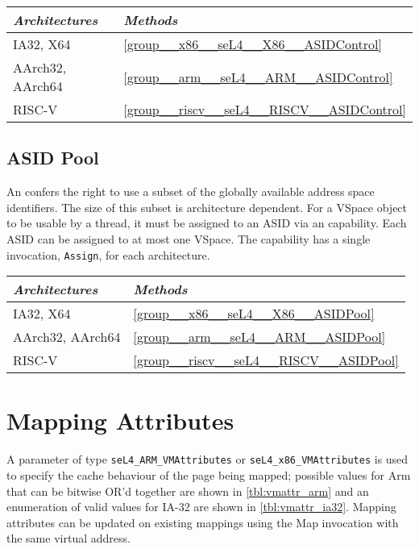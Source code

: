 \begin{tabularx}{\textwidth}{Xl} \toprule
\emph{Architectures} & \emph{Methods} \\ \midrule
IA32, X64            & \autoref{group__x86__seL4__X86__ASIDControl} \\
AArch32, AArch64     & \autoref{group__arm__seL4__ARM__ASIDControl} \\
RISC-V               & \autoref{group__riscv__seL4__RISCV__ASIDControl} \\
\bottomrule
\end{tabularx}

\subsection{ASID Pool}

An  confers the right to use a subset of the globally available address space
identifiers. The size of this subset is architecture dependent. For a VSpace object to be usable by
a thread, it must be assigned to an ASID via an  capability. Each ASID can be
assigned to at most one VSpace. The  capability has a single invocation,
\texttt{Assign}, for each architecture.

\begin{tabularx}{\textwidth}{Xl} \toprule
\emph{Architectures} & \emph{Methods} \\ \midrule
IA32, X64            & \autoref{group__x86__seL4__X86__ASIDPool} \\
AArch32, AArch64     & \autoref{group__arm__seL4__ARM__ASIDPool} \\
RISC-V               & \autoref{group__riscv__seL4__RISCV__ASIDPool} \\
\bottomrule
\end{tabularx}

\section{Mapping Attributes}
A parameter of type \texttt{seL4\_ARM\_VMAttributes} or
\texttt{seL4\_x86\_VMAttributes} is used to specify the cache behaviour of the
page being mapped; possible values for Arm that can be bitwise OR'd together are
shown in \autoref{tbl:vmattr_arm} \ifxeightsix and an enumeration of valid values
for IA-32 are shown in \autoref{tbl:vmattr_ia32}\fi. Mapping attributes can be updated on existing mappings using the Map invocation with the same virtual address.

